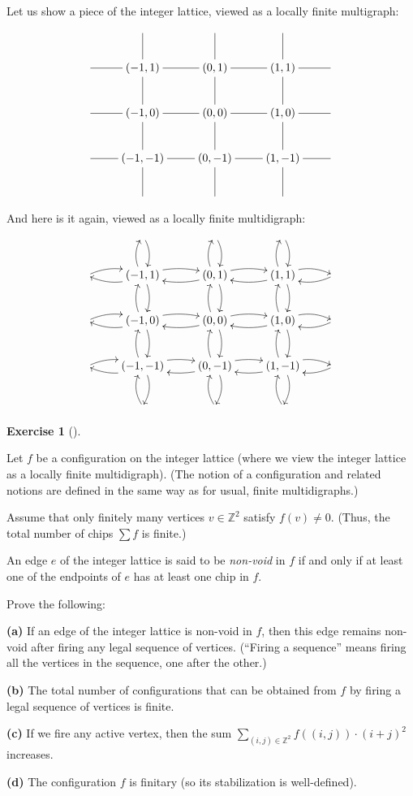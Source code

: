 \documentclass[numbers=enddot,12pt,final,onecolumn,notitlepage]{scrartcl}%
\makeatletter
\newcounter{exer}
\theoremstyle{definition}
\newtheorem{exmp}[exer]{Exercise}
\newenvironment{exercise}[1][]
{\begin{exmp}[#1]\begin{leftbar}}
{\end{leftbar}\end{exmp}}
\let\sumnonlimits\sum
\renewcommand{\sum}{\sumnonlimits\limits}
\newcommand{\ZZ}{\mathbb{Z}}
\newcommand{\tup}[1]{\left( #1 \right)}
\newcommand{\are}{\ar@{-}}
\newcommand{\arebi}[1][]{\ar@{<-}@/_/[#1] \ar@/^/[#1]}
\makeatother
\begin{document}
Let us show a piece of the integer lattice, viewed as
a locally finite multigraph:
\[
\xymatrix{
& \are[d] & \are[d] & \are[d] & \\
\are[r] & \tup{-1, 1} \are[d] \are[r] & \tup{0, 1} \are[d] \are[r] & \tup{1, 1} \are[d] \are[r] & \\
\are[r] & \tup{-1, 0} \are[d] \are[r] & \tup{0, 0} \are[d] \are[r] & \tup{1, 0} \are[d] \are[r] & \\
\are[r] & \tup{-1, -1} \are[d] \are[r] & \tup{0, -1} \are[d] \are[r] & \tup{1, -1} \are[d] \are[r] & \\
& & & &
}
\]
And here is it again, viewed as a locally finite
multidigraph:
\[
\xymatrix{
& \arebi[d] & \arebi[d] & \arebi[d] & \\
\arebi[r] & \tup{-1, 1} \arebi[d] \arebi[r] & \tup{0, 1} \arebi[d] \arebi[r] & \tup{1, 1} \arebi[d] \arebi[r] & \\
\arebi[r] & \tup{-1, 0} \arebi[d] \arebi[r] & \tup{0, 0} \arebi[d] \arebi[r] & \tup{1, 0} \arebi[d] \arebi[r] & \\
\arebi[r] & \tup{-1, -1} \arebi[d] \arebi[r] & \tup{0, -1} \arebi[d] \arebi[r] & \tup{1, -1} \arebi[d] \arebi[r] & \\
& & & &
}
\]

\begin{exercise} \label{exe.chip.Z2}
Let $f$ be a configuration on the integer lattice
(where we view the integer lattice as a locally
finite multidigraph).
(The notion of a configuration and related notions
are defined in the same way as for usual, finite
multidigraphs.)

Assume that only finitely many vertices $v \in \ZZ^2$
satisfy $f \tup{v} \neq 0$.
(Thus, the total number of chips $\sum f$ is finite.)

An edge $e$ of the integer lattice is
said to be \textit{non-void} in $f$ if and only if
at least one of the endpoints of $e$ has at least one
chip in $f$.

Prove the following:

\textbf{(a)} If an edge of the integer lattice is
non-void in $f$, then this edge remains non-void after
firing any legal sequence of vertices.
(``Firing a sequence'' means firing all the vertices
in the sequence, one after the other.)

\textbf{(b)} The total number of configurations that
can be obtained from $f$ by firing a legal sequence
of vertices is finite.

\textbf{(c)} If we fire any active vertex, then the
sum $\sum_{\tup{i, j} \in \ZZ^2} f \tup{\tup{i, j}}
\cdot \tup{i + j}^2$ increases.

\textbf{(d)} The configuration $f$ is finitary (so its
stabilization is well-defined).
\end{exercise}
\end{document}
